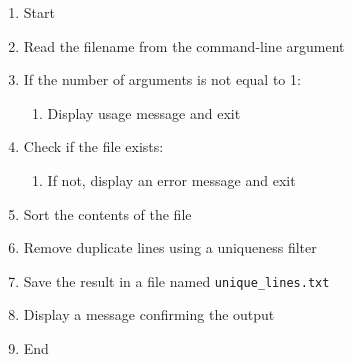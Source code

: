 \begin{enumerate}
    \item Start
    \item Read the filename from the command-line argument
    \item If the number of arguments is not equal to 1:
    \begin{enumerate}
        \item Display usage message and exit
    \end{enumerate}
    \item Check if the file exists:
    \begin{enumerate}
        \item If not, display an error message and exit
    \end{enumerate}
    \item Sort the contents of the file
    \item Remove duplicate lines using a uniqueness filter
    \item Save the result in a file named \texttt{unique\_lines.txt}
    \item Display a message confirming the output
    \item End
\end{enumerate}

